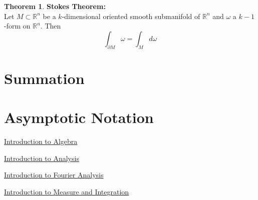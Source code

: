 \documentclass{book}
\theoremstyle{definition}
\newtheorem{thm}[definition]{Theorem}
\newcommand{\om}{\omega}
\newcommand{\R}{\mathbb{R}}
\DeclareMathOperator*{\0}{\mbf{0}}
\DeclareMathOperator*{\1}{\mbf{1}}
\newcommand{\tbf}[1]{\textbf{#1}}
\begin{document}
	\begin{thm}\tbf{Stokes Theorem:}\\
		Let $M \subset \R^n$ be a $k$-dimensional oriented smooth submanifold of $\R^n$ and $\om$ a $k-1$-form on $\R^n$. Then $$\int_{\partial M} \om = \int_M d \om$$
	\end{thm}



	

\appendix

\chapter{Summation}


\newpage	

\chapter{Asymptotic Notation}








\backmatter
\begin{thebibliography}{4}
	 \href{https://github.com/carsonaj/Mathematics/blob/master/Introduction\%20to\%20Algebra/Introduction\%20to\%20Algebra.pdf}{Introduction to Algebra}
	
	  \href{https://github.com/carsonaj/Mathematics/blob/master/Introduction\%20to\%20Analysis/Introduction\%20to\%20Analysis.pdf}{Introduction to Analysis}	
	
	  \href{https://github.com/carsonaj/Mathematics/blob/master/Introduction\%20to\%20Fourier\%20Analysis/Introduction\%20to\%20Fourier\%20Analysis.pdf}{Introduction to Fourier Analysis}
	
	  \href{https://github.com/carsonaj/Mathematics/blob/master/Introduction\%20to\%20Measure\%20and\%20Integration/Introduction\%20to\%20Measure\%20and\%20Integration.pdf}{Introduction to Measure and Integration}
	
	
	
\end{thebibliography}
\end{document}
